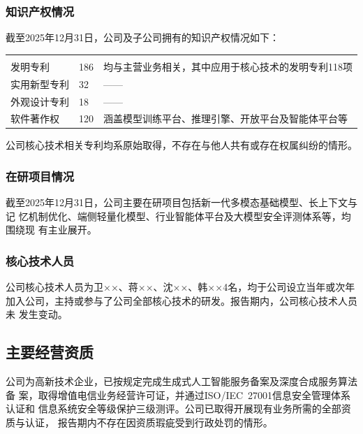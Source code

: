 \subsubsection{知识产权情况}

截至2025年12月31日，公司及子公司拥有的知识产权情况如下：

\begin{gstab}
\begin{longtable}{|L{40mm}|R{30mm}|L{56mm}|}
\hline
{} &  &  \\ \hline
\endfirsthead
\hline
{} &  &  \\ \hline
\endhead
发明专利 & 186 & 均与主营业务相关，其中应用于核心技术的发明专利118项 \\ \hline
实用新型专利 & 32 & —— \\ \hline
外观设计专利 & 18 & —— \\ \hline
软件著作权 & 120 & 涵盖模型训练平台、推理引擎、开放平台及智能体平台等 \\ \hline
\end{longtable}
\end{gstab}

公司核心技术相关专利均系原始取得，不存在与他人共有或存在权属纠纷的情形。

\subsubsection{在研项目情况}

截至2025年12月31日，公司主要在研项目包括新一代多模态基础模型、长上下文与记
忆机制优化、端侧轻量化模型、行业智能体平台及大模型安全评测体系等，均围绕现
有主业展开。

\subsubsection{核心技术人员}

公司核心技术人员为卫××、蒋××、沈××、韩××4名，均于公司设立当年或次年
加入公司，主持或参与了公司全部核心技术的研发。报告期内，公司核心技术人员未
发生变动。

\subsection{主要经营资质}

公司为高新技术企业，已按规定完成生成式人工智能服务备案及深度合成服务算法备
案，取得增值电信业务经营许可证，并通过ISO/IEC~27001信息安全管理体系认证和
信息系统安全等级保护三级测评。公司已取得开展现有业务所需的全部资质与认证，
报告期内不存在因资质瑕疵受到行政处罚的情形。
